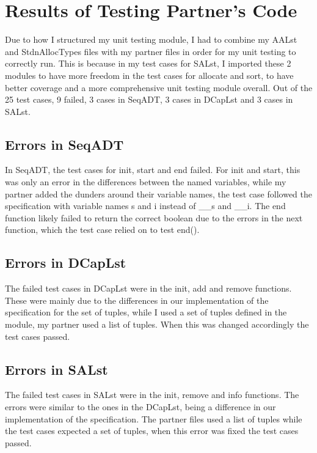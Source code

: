 \documentclass[12pt]{article}
\begin{document}
\section{Results of Testing Partner's Code}

Due to how I structured my unit testing module, I had to combine my AALst and StdnAllocTypes files with my partner files in order for my unit testing to correctly run. This is because in my test cases for SALst, I imported these 2 modules to have more freedom in the test cases for allocate and sort, to have better coverage and a more comprehensive unit testing module overall. Out of the 25 test cases, 9 failed, 3 cases in SeqADT, 3 cases in DCapLst and 3 cases in SALst.

\subsection{Errors in SeqADT}

In SeqADT, the test cases for init, start and end failed. For init and start, this was only an error in the differences between the named variables, while my partner added the dunders around their variable names, the test case followed the specification with variable names s and i instead of \_\_s and \_\_i.  The end function likely failed to return the correct boolean due to the errors in the next function, which the test case relied on to test end().

\subsection{Errors in DCapLst}

The failed test cases in DCapLst were in the init, add and remove functions. These were mainly due to the differences in our implementation of the specification for the set of tuples, while I used a set of tuples defined in the module, my partner used a list of tuples. When this was changed accordingly the test cases passed.

\subsection{Errors in SALst}

The failed test cases in SALst were in the init, remove and info functions. The errors were similar to the ones in the DCapLst, being a difference in our implementation of the specification. The partner files used a list of tuples while the test cases expected a set of tuples, when this error was fixed the test cases passed.
\end{document}
